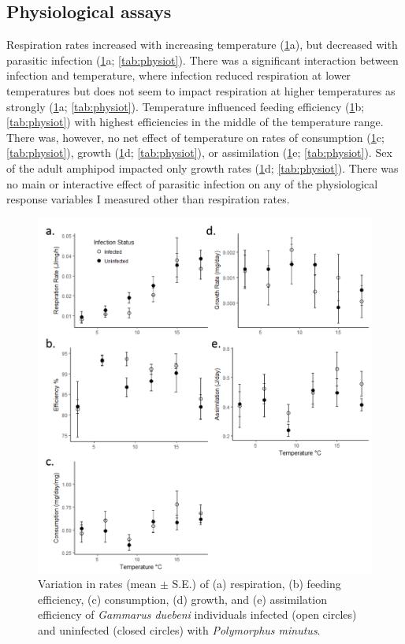 \subsection{Physiological assays}
Respiration rates increased with increasing temperature (\ref{fig:physio}a), but decreased with parasitic infection (\ref{fig:physio}a; \ref{tab:physiot}). There was a significant interaction between infection and temperature, where infection reduced respiration at lower temperatures but does not seem to impact respiration at higher temperatures as strongly (\ref{fig:physio}a; \ref{tab:physiot}). Temperature influenced feeding efficiency (\ref{fig:physio}b; \ref{tab:physiot}) with highest efficiencies in the middle of the temperature range. There was, however, no net effect of temperature on rates of consumption (\ref{fig:physio}c; \ref{tab:physiot}), growth (\ref{fig:physio}d; \ref{tab:physiot}), or assimilation (\ref{fig:physio}e; \ref{tab:physiot}). Sex of the adult amphipod impacted only growth rates (\ref{fig:physio}d; \ref{tab:physiot}). There was no main or interactive effect of parasitic infection on any of the physiological response variables I measured other than respiration rates. 

\begin{figure}%
    \centering
    \includegraphics[scale=0.9]{figures/ch2/physio.png}
  \caption [Impact of temperature and parasites on host physiology]{Variation in rates (mean  $\pm$ S.E.) of (a) respiration, (b) feeding efficiency, (c) consumption, (d) growth, and (e) assimilation efficiency of \emph{Gammarus duebeni} individuals infected (open circles) and uninfected (closed circles) with \emph{Polymorphus minutus}.} 
    \label{fig:physio}
\end{figure}

